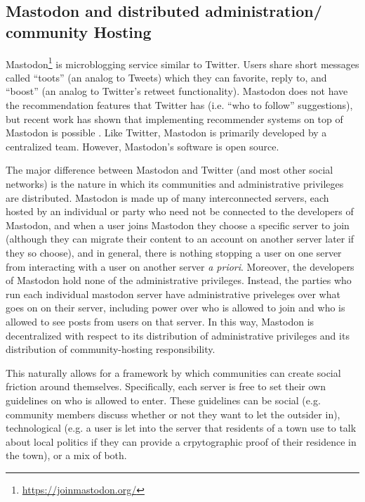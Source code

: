 \documentclass[sigconf,authordraft]{acmart}
\begin{document}
\subsection{Mastodon and distributed administration/ community Hosting}

Mastodon\footnote{\url{https://joinmastodon.org/}} is microblogging service similar to Twitter. Users share short messages called ``toots'' (an analog to Tweets) which they can favorite, reply to, and ``boost'' (an analog to Twitter's retweet functionality). Mastodon does not have the recommendation features that Twitter has (i.e. ``who to follow'' suggestions), but recent work has shown that implementing recommender systems on top of Mastodon is possible \cite{trienes2018recommending}. Like Twitter, Mastodon is primarily developed by a centralized team. However, Mastodon's software is open source.

The major difference between Mastodon and Twitter (and most other social networks) is the nature in which its communities and administrative privileges are distributed. Mastodon is made up of many interconnected servers, each hosted by an individual or party who need not be connected to the developers of Mastodon, and when a user joins Mastodon they choose a specific server to join (although they can migrate their content to an account on another server later if they so choose), and in general, there is nothing stopping a user on one server from interacting with a user on another server {\itshape a priori}. Moreover, the developers of Mastodon hold none of the administrative privileges. Instead, the parties who run each individual mastodon server have administrative priveleges over what goes on on their server, including power over who is allowed to join and who is allowed to see posts from users on that server. In this way, Mastodon is decentralized with respect to its distribution of administrative privileges and its distribution of community-hosting responsibility.

This naturally allows for a framework by which communities can create social friction around themselves. Specifically, each server is free to set their own guidelines on who is allowed to enter. These guidelines can be social (e.g. community members discuss whether or not they want to let the outsider in), technological (e.g. a user is let into the server that residents of a town use to talk about local politics if they can provide a crpytographic proof of their residence in the town), or a mix of both. 
\end{document}
